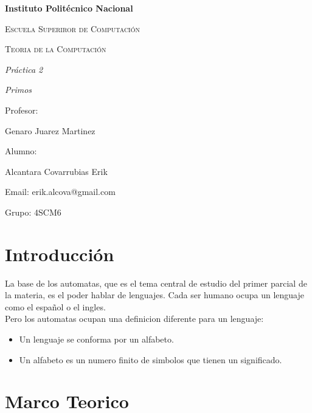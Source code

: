 \documentclass{article}
\begin{document}
\begin{titlepage}
\centering

{\bfseries\LARGE Instituto Polit\'ecnico Nacional \par}
\vspace{1cm}
{\scshape\Large Escuela Superiror de Computaci\'on \par}
\vspace{3cm}
{\scshape\Large Teoria de la Computaci\'on \par}
\vspace{3cm}
{\itshape\Large Pr\'actica 2 \par}
{\itshape\Large Primos \par}
\vfill
{\Large Profesor: \par}
{\Large Genaro Juarez Martinez \par}
{\Large Alumno: \par}
{\Large Alcantara Covarrubias Erik \par}
{\Large Email: erik.alcova@gmail.com \par}
{\Large Grupo: 4SCM6\par}
\vfill
\end{titlepage}

\tableofcontents

\newpage

\section{Introducción}
La base de los automatas, que es el tema central de estudio del primer parcial de la materia, es el poder hablar de lenguajes. Cada ser humano ocupa un lenguaje como el español o el ingles. 
\\Pero los automatas ocupan una definicion diferente para un lenguaje:
\begin{itemize}
    \item Un lenguaje se conforma por un alfabeto.
    \item Un alfabeto es un numero finito de simbolos que tienen un significado.
\end{itemize}

\section{Marco Teorico}
\end{document}

